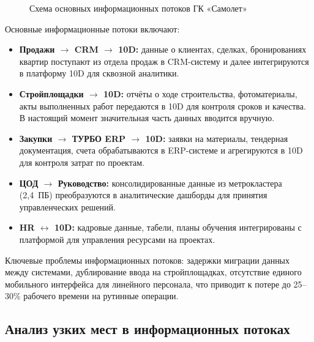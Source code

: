 \documentclass[12pt,a4paper]{article}
\begin{document}
\begin{figure}[H]
\caption{Схема основных информационных потоков ГК «Самолет»}
\label{fig:infoflows}
\end{figure}

Основные информационные потоки включают:

\begin{itemize}[leftmargin=20pt]
  \item \textbf{Продажи $\to$ CRM $\to$ 10D:} данные о клиентах, сделках, бронированиях квартир поступают из отдела продаж в CRM-систему и далее интегрируются в платформу 10D для сквозной аналитики.
  \item \textbf{Стройплощадки $\to$ 10D:} отчёты о ходе строительства, фотоматериалы, акты выполненных работ передаются в 10D для контроля сроков и качества. В настоящий момент значительная часть данных вводится вручную.
  \item \textbf{Закупки $\to$ ТУРБО ERP $\to$ 10D:} заявки на материалы, тендерная документация, счета обрабатываются в ERP-системе и агрегируются в 10D для контроля затрат по проектам.
  \item \textbf{ЦОД $\to$ Руководство:} консолидированные данные из метрокластера (2,4~ПБ) преобразуются в аналитические дашборды для принятия управленческих решений.
  \item \textbf{HR $\leftrightarrow$ 10D:} кадровые данные, табели, планы обучения интегрированы с платформой для управления ресурсами на проектах.
\end{itemize}

Ключевые проблемы информационных потоков: задержки миграции данных между системами, дублирование ввода на стройплощадках, отсутствие единого мобильного интерфейса для линейного персонала, что приводит к потере до 25--30\% рабочего времени на рутинные операции.

\subsection{Анализ узких мест в информационных потоках}
\end{document}
